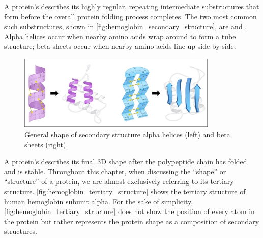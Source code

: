 A protein's  describes its highly regular, repeating intermediate substructures that form before the overall protein folding process completes. The two most common such substructures, shown in \autoref{fig:hemoglobin_secondary_structure}, are  and . Alpha helices occur when nearby amino acids wrap around to form a tube structure; beta sheets occur when nearby amino acids line up side-by-side.\\

\begin{figure}[h]
	\centering
	\mySfFamily
	\includegraphics[width = 0.85\textwidth]{../images/hemoglobin_secondary_structure.png}
	\caption{General shape of secondary structure alpha helices (left) and beta sheets (right).}
	\label{fig:hemoglobin_secondary_structure}
\end{figure}

A protein's  describes its final 3D shape after the polypeptide chain has folded and is stable. Throughout this chapter, when discussing the ``shape'' or ``structure'' of a protein, we are almost exclusively referring to its tertiary structure. \autoref{fig:hemoglobin_tertiary_structure} shows the tertiary structure of human hemoglobin subunit alpha. For the sake of simplicity, \autoref{fig:hemoglobin_tertiary_structure} does not show the position of every atom in the protein but rather represents the protein shape as a composition of secondary structures.

